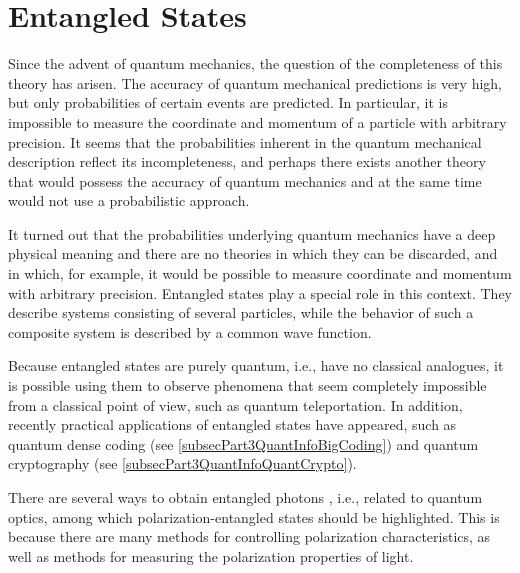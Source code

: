 \chapter{Entangled States}
\label{ch:entangl}

Since the advent of quantum mechanics, the question of the completeness
of this theory has arisen. The accuracy of quantum mechanical predictions is very high, but
only probabilities of certain events are predicted. In particular,
it is impossible to measure the coordinate and
momentum of a particle with arbitrary precision. It seems that
the probabilities inherent in the quantum mechanical description reflect its
incompleteness, and perhaps there exists another theory that would possess
the accuracy of quantum mechanics and at the same time would not use
a probabilistic approach.

It turned out that the probabilities underlying quantum mechanics have
a deep physical meaning and there are no theories in which
they can be discarded, and in which, for example,
it would be possible to measure coordinate and momentum with arbitrary precision.
Entangled states play a special role in this context. They describe systems consisting of several particles,
while the behavior of such a composite system is described by a common wave
function.

Because entangled states are purely quantum,
i.e., have no classical analogues, it is possible using them
to observe phenomena that seem completely
impossible from a classical point of view, such as quantum
teleportation. In addition, recently practical
applications of entangled states have appeared, such as quantum dense
coding 
(see \ref{subsecPart3QuantInfoBigCoding})
and quantum cryptography
(see \ref{subsecPart3QuantInfoQuantCrypto}).

There are several ways to obtain entangled photons
\cite{bPhisQuantInfo}, i.e., related to quantum optics,
among which polarization-entangled
states should be highlighted. This is because there are many
methods for controlling polarization characteristics, as well as
methods for measuring the polarization properties of light.


%



